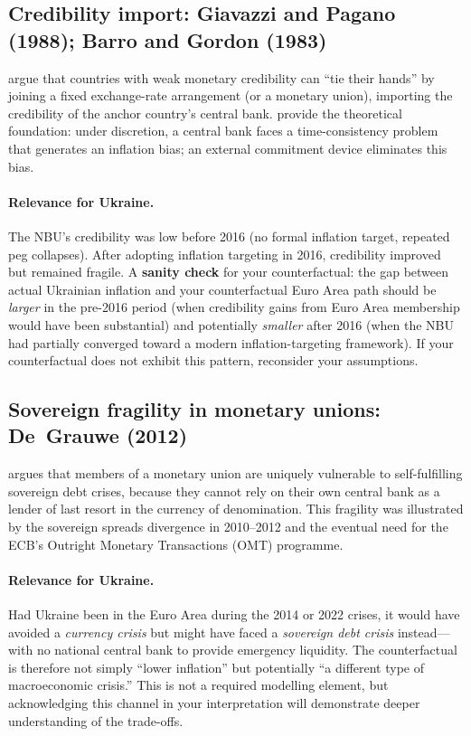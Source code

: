 \documentclass[11pt,a4paper]{article}
\begin{document}
\subsection*{Credibility import: Giavazzi and Pagano (1988); Barro and Gordon (1983)}

\citet{giavazzi_pagano1988} argue that countries with weak monetary credibility
can ``tie their hands'' by joining a fixed exchange-rate arrangement (or a
monetary union), importing the credibility of the anchor country's central
bank. \citet{barro_gordon1983} provide the theoretical foundation: under
discretion, a central bank faces a time-consistency problem that generates an
inflation bias; an external commitment device eliminates this bias.

\paragraph{Relevance for Ukraine.}
The NBU's credibility was low before 2016 (no formal inflation target, repeated
peg collapses). After adopting inflation targeting in 2016, credibility improved
but remained fragile. A \textbf{sanity check} for your counterfactual: the gap
between actual Ukrainian inflation and your counterfactual Euro Area path
should be \emph{larger} in the pre-2016 period (when credibility gains from Euro
Area membership would have been substantial) and potentially \emph{smaller}
after 2016 (when the NBU had partially converged toward a modern
inflation-targeting framework). If your counterfactual does not exhibit this
pattern, reconsider your assumptions.


\subsection*{Sovereign fragility in monetary unions: De~Grauwe (2012)}

\citet{degrauwe2012} argues that members of a monetary union are uniquely
vulnerable to self-fulfilling sovereign debt crises, because they cannot rely
on their own central bank as a lender of last resort in the currency of
denomination. This fragility was illustrated by the sovereign spreads divergence
in 2010--2012 and the eventual need for the ECB's Outright Monetary
Transactions (OMT) programme.

\paragraph{Relevance for Ukraine.}
Had Ukraine been in the Euro Area during the 2014 or 2022 crises, it would have
avoided a \emph{currency crisis} but might have faced a \emph{sovereign debt
crisis} instead---with no national central bank to provide emergency liquidity.
The counterfactual is therefore not simply ``lower inflation'' but potentially
``a different type of macroeconomic crisis.'' This is not a required modelling
element, but acknowledging this channel in your interpretation will demonstrate
deeper understanding of the trade-offs.
\end{document}
